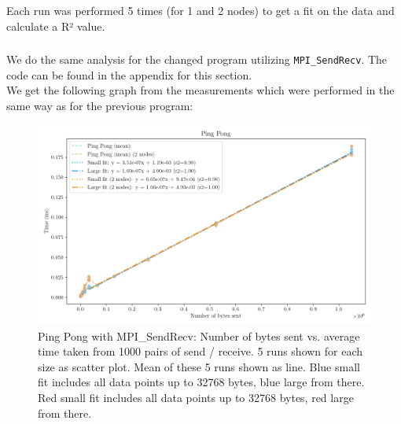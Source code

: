  Each run was performed 5 times (for 1 and 2 nodes) to get a fit on the data and calculate a R² value. 


\subsubsection*{}
We do the same analysis for the changed program utilizing \texttt{MPI\_SendRecv}. The code can be found in the appendix for this section. \\
We get the following graph from the measurements which were performed in the same way as for the previous program:
\begin{figure}[H]
    \centering
    \includegraphics[width=\textwidth]{../fig/lab0/pingPongSR.png}
    \caption{Ping Pong with MPI\_SendRecv: Number of bytes sent vs. average time taken from 1000 pairs of send / receive. 5 runs shown for each size as scatter plot. Mean of these 5 runs shown as line. Blue small fit includes all data points up to 32768 bytes, blue large from there. Red small fit includes all data points up to 32768 bytes, red large from there.}
    \label{fig:pingpongSendRecv}
\end{figure}


